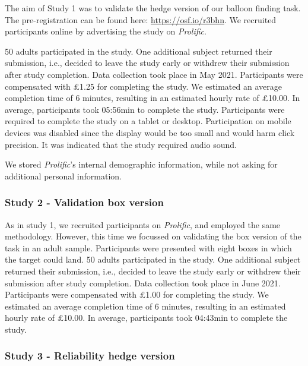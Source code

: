 \documentclass[
  man,floatsintext]{apa6}
\begin{document}
The aim of Study 1 was to validate the hedge version of our balloon finding task. The pre-registration can be found here: \url{https://osf.io/r3bhn}. We recruited participants online by advertising the study on \emph{Prolific}.

50 adults participated in the study. One additional subject returned their submission, i.e., decided to leave the study early or withdrew their submission after study completion. Data collection took place in May 2021.
Participants were compensated with £1.25 for completing the study. We estimated an average completion time of 6 minutes, resulting in an estimated hourly rate of £10.00. In average, participants took 05:56min to complete the study.
Participants were required to complete the study on a tablet or desktop. Participation on mobile devices was disabled since the display would be too small and would harm click precision. It was indicated that the study required audio sound.

We stored \emph{Prolific}'s internal demographic information, while not asking for additional personal information.

\hypertarget{study-2---validation-box-version}{%
\subsubsection{Study 2 - Validation box version}\label{study-2---validation-box-version}}

As in study 1, we recruited participants on \emph{Prolific}, and employed the same methodology. However, this time we focussed on validating the box version of the task in an adult sample. Participants were presented with eight boxes in which the target could land.
50 adults participated in the study. One additional subject returned their submission, i.e., decided to leave the study early or withdrew their submission after study completion. Data collection took place in June 2021.
Participants were compensated with £1.00 for completing the study. We estimated an average completion time of 6 minutes, resulting in an estimated hourly rate of £10.00. In average, participants took 04:43min to complete the study.

\hypertarget{study-3---reliability-hedge-version}{%
\subsubsection{Study 3 - Reliability hedge version}\label{study-3---reliability-hedge-version}}
\end{document}
